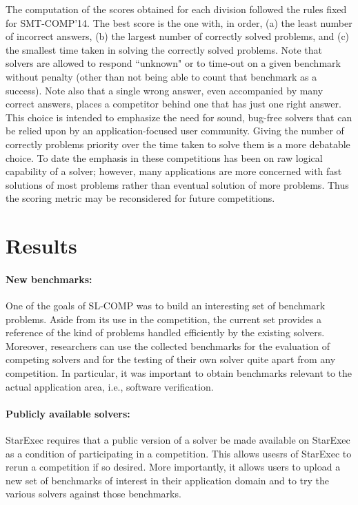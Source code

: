 \documentclass{llncs}
\begin{document}
The computation of the scores obtained for each division followed the rules fixed for SMT-COMP'14.
The best score is the one with, in order, (a) the least number of incorrect answers, (b) the largest number of correctly solved problems, and (c) the smallest time taken in solving the correctly solved problems.
Note that solvers are allowed to respond ``unknown" or to time-out on a given benchmark without penalty (other than not being able to count that benchmark as a success).
Note also that a single wrong answer, even accompanied by many correct answers, places a competitor behind one that has just one right answer. This choice is intended to emphasize the need for sound, bug-free solvers that can be relied upon by an application-focused user community. Giving the number of correctly problems priority over the time taken to solve them is a more debatable choice. To date the emphasis in these competitions has been on raw logical capability of a solver; however, many applications are more concerned with fast solutions of most problems rather than eventual solution of more problems. Thus the scoring metric may be reconsidered for future competitions.




\section{Results}

\paragraph{New benchmarks:}
One of the goals of SL-COMP was to build an interesting set of benchmark problems. 
Aside from its use in the competition, the current set provides a reference of the kind of problems handled efficiently by the existing solvers.
Moreover, researchers can use the collected benchmarks for the evaluation of competing solvers and for the testing of their own solver quite apart from any competition. 
In particular, it was important to obtain benchmarks relevant to the actual application area, i.e., software verification.

\paragraph{Publicly available solvers:} StarExec requires that a public version of a solver be made available on StarExec as a condition of participating in a competition. This allows usesrs of StarExec to rerun a competition if so desired. More importantly, it allows users to upload a new set of benchmarks of interest in their application domain and to try the various solvers against those benchmarks.
\end{document}
